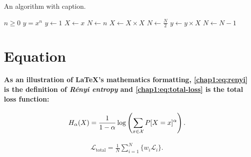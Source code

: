 \begin{algorithm}[ht]
\caption{An algorithm with caption.}
\label{chap1:algo:my-algo}
\normalsize\singlespacing
\begin{algorithmic}[1] %
    \Require $n \geq 0$
    \Ensure $y = x^n$
    \State $y \gets 1$
    \State $X \gets x$
    \State $N \gets n$
        \State $X \gets X \times X$
        \State $N \gets \frac{N}{2}$  
        \State $y \gets y \times X$
        \State $N \gets N - 1$
    \EndIf
    \EndWhile
\end{algorithmic}
\end{algorithm}



\section{Equation} 

\paragraph{As an illustration of \LaTeX's mathematics formatting,
\autoref{chap1:eq:renyi} is the definition of {\em R\'enyi entropy} and \autoref{chap1:eq:total-loss} is the total loss function:
}

\begin{equation}
\label{chap1:eq:renyi}
H_{\alpha}(X) =
\frac{1}{1-\alpha}
\log \left(\sum_{x \in {\cal X}}P[X=x]^{\alpha} \right) .
\end{equation}

\begin{equation} 
\label{chap1:eq:total-loss}
\begin{aligned}
\mathcal{L}_{\textrm{total}} = \frac{1}{N}\sum_{i=1}^{N}\{w_i\mathcal{L}_i\}. 
\end{aligned}
\end{equation}


\paragraph{
\lipsum[1][1-3] %
}